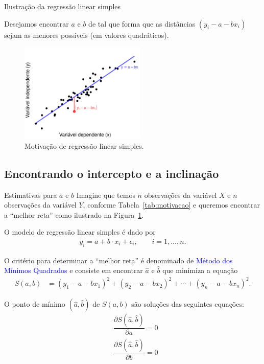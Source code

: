 \documentclass[8pt]{beamer}
\begin{document}
\begin{frame}{Ilustração da regressão linear simples}
	
	Desejamos encontrar $a$ e $b$ de tal que forma que as distâncias $(y_i-a-bx_i)$ sejam as menores possíveis (em valores quadráticos).
	\begin{figure}[htbp]
		\centering
		\caption{Motivação de regressão linear simples.}
		\label{fig:motivacao}
		\includegraphics[width=6cm]{figure/motivacao_regressao.png}
	\end{figure}
\end{frame}

\subsection{Encontrando o intercepto e a inclinação}

\begin{frame}{Estimativas para $a$ e $b$}
	Imagine que temos $n$ observações da variável $X$ e $n$ observações da variável $Y$, conforme Tabela~\ref{tab:motivacao} e queremos encontrar a ``melhor reta'' como ilustrado na Figura~\ref{fig:motivacao}.

	
	O modelo de regressão linear simples é dado por
	\begin{align*}
	y_i = a + b \cdot x_i + \epsilon_i,\qquad i=1, \dots, n.
	\end{align*}
	
	O critério para determinar a ``melhor reta'' é denominado de \textcolor{blue}{Método dos Mínimos Quadrados} e consiste em encontrar $\hat{a}$ e $\hat{b}$ que minimiza a equação
	\begin{align*}
	S(a, b) &= (y_1 - a - bx_1)^2 + (y_2 - a - bx_2)^2+\cdots + (y_n - a - bx_n)^2.
	\end{align*}
	
	O ponto de mínimo $(\hat{a}, \hat{b})$ de $S(a,b)$ são soluções das seguintes equações:
	\begin{align} \label{eq:eq_normais}
	\nonumber&\dfrac{\partial S(\hat{a}, \hat{b})}{\partial a} =0\\
	&\dfrac{\partial S(\hat{a}, \hat{b})}{\partial b} =0
	\end{align}
\end{frame}
\end{document}

